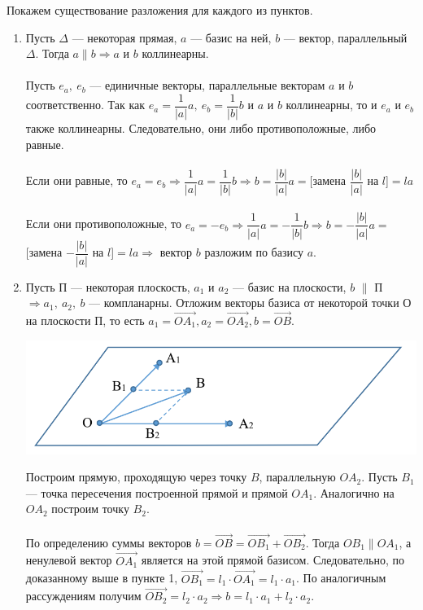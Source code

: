 \begin{Proof}
	Покажем существование разложения для каждого из пунктов.\begin{enumerate}
		\item Пусть $\Delta$ --- некоторая прямая, $a$ --- базис на ней, $b$ --- вектор, параллельный $\Delta$. Тогда $a \parallel b\Rightarrow a$ и $b$ коллинеарны.\\\\
		Пусть $e_a,\ e_b$ --- единичные векторы, параллельные векторам $a$ и $b$ соответственно. Так как $e_a = \dfrac{1}{|a|}a,\ e_b = \dfrac{1}{|b|}b$ и $a$ и $b$ коллинеарны, то и $e_a$ и $e_b$ также коллинеарны. Следовательно, они либо противоположные, либо равные.\\\\
		Если они равные, то $e_a = e_b \Rightarrow\dfrac{1}{|a|}a = \dfrac{1}{|b|}b\Rightarrow b = \dfrac{|b|}{|a|}a = $[замена $\dfrac{|b|}{|a|}$ на $l$]$ = la$\\\\
		Если они противоположные, то $e_a = -e_b \Rightarrow\dfrac{1}{|a|}a = -\dfrac{1}{|b|}b\Rightarrow b = -\dfrac{|b|}{|a|}a = $[замена $-\dfrac{|b|}{|a|}$ на $l$]$ = la\Rightarrow$ вектор $b$ разложим по базису $a$.
		\item Пусть П --- некоторая плоскость, $a_1$ и $a_2$ --- базис на плоскости, $b$ $\parallel$ П $\Rightarrow a_1,\ a_2,\ b$ --- компланарны. Отложим векторы базиса от некоторой точки О на плоскости П, то есть $a_1 = \overrightarrow{OA_1}, a_2 = \overrightarrow{OA_2}, b = \overrightarrow{OB}$.
		\begin{center}
			\includegraphics[scale=0.5]{images/pl_in_2_2.png}
		\end{center}
		Построим прямую, проходящую через точку $B$, параллельную $OA_2$. Пусть $B_1$ --- точка пересечения построенной прямой и прямой $OA_1$. Аналогично на $OA_2$ построим точку $B_2$.\\\\
		По определению суммы векторов $b = \overrightarrow{OB} = \overrightarrow{OB_1} + \overrightarrow{OB_2}.$ Тогда $OB_1 \parallel OA_1$, а ненулевой вектор $\overrightarrow{OA_1}$ является на этой прямой базисом. Следовательно, по доказанному выше в пункте 1, $\overrightarrow{OB_1} = l_1 \cdot \overrightarrow{OA_1} = l_1\cdot a_1$. По аналогичным рассуждениям получим $\overrightarrow{OB_2} = l_2\cdot a_2\Rightarrow b = l_1\cdot a_1 + l_2 \cdot a_2$.

\end{enumerate}
\end{Proof}
